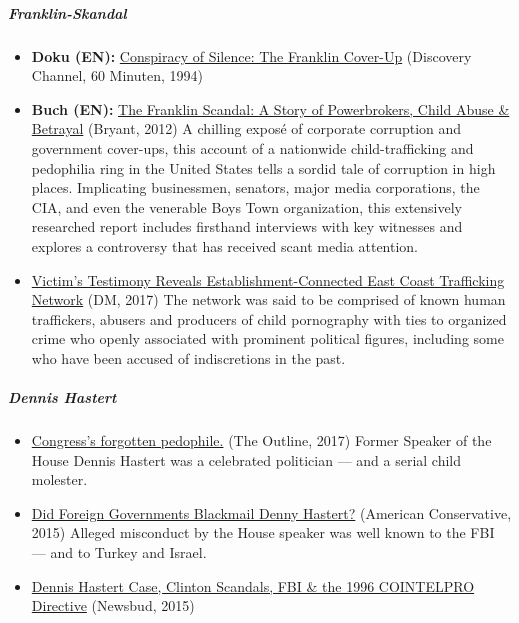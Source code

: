 \hypertarget{franklin-skandal}{%
\subparagraph{\texorpdfstring{\textbf{Franklin-Skandal}}{Franklin-Skandal}}\label{franklin-skandal}}

\begin{itemize}
\tightlist
\item
  \textbf{Doku (EN):}
  \href{https://www.youtube.com/watch?v=K316V75MPpo}{Conspiracy of
  Silence: The Franklin Cover-Up} (Discovery Channel, 60 Minuten, 1994)
\item
  \textbf{Buch (EN):}
  \href{https://www.amazon.com/Franklin-Scandal-Story-Powerbrokers-Betrayal/dp/1936296071}{The
  Franklin Scandal: A Story of Powerbrokers, Child Abuse \& Betrayal}
  (Bryant, 2012) A chilling exposé of corporate corruption and
  government cover-ups, this account of a nationwide child-trafficking
  and pedophilia ring in the United States tells a sordid tale of
  corruption in high places. Implicating businessmen, senators, major
  media corporations, the CIA, and even the venerable Boys Town
  organization, this extensively researched report includes firsthand
  interviews with key witnesses and explores a controversy that has
  received scant media attention.
\item
  \href{https://web.archive.org/web/20180429120842/https://disobedientmedia.com/2017/12/victims-testimony-reveals-establishment-connected-east-coast-trafficking-network/}{Victim's
  Testimony Reveals Establishment-Connected East Coast Trafficking
  Network} (DM, 2017) The network was said to be comprised of known
  human traffickers, abusers and producers of child pornography with
  ties to organized crime who openly associated with prominent political
  figures, including some who have been accused of indiscretions in the
  past.
\end{itemize}

\hypertarget{dennis-hastert}{%
\subparagraph{\texorpdfstring{\textbf{Dennis
Hastert}}{Dennis Hastert}}\label{dennis-hastert}}

\begin{itemize}
\tightlist
\item
  \href{https://theoutline.com/post/2500/dennis-hastert-congress-forgotten-pedophile}{Congress's
  forgotten pedophile.} (The Outline, 2017) Former Speaker of the House
  Dennis Hastert was a celebrated politician --- and a serial child
  molester.
\item
  \href{https://www.theamericanconservative.com/articles/how-a-plea-deal-for-hastert-may-hide-the-truth/}{Did
  Foreign Governments Blackmail Denny Hastert?} (American Conservative,
  2015) Alleged misconduct by the House speaker was well known to the
  FBI --- and to Turkey and Israel.
\item
  \href{https://www.newsbud.com/2015/09/20/dennis-hastert-case-clinton-scandals-fbi-the-1996-cointelpro-directive/}{Dennis
  Hastert Case, Clinton Scandals, FBI \& the 1996 COINTELPRO Directive}
  (Newsbud, 2015)
\end{itemize}


